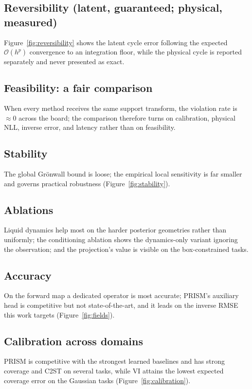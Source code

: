 \documentclass{article}
\begin{document}
\subsection{Reversibility (latent, guaranteed; physical, measured)}

Figure~\ref{fig:reversibility} shows the latent cycle error following the expected
$\mathcal{O}(h^{p})$ convergence to an integration floor, while the physical cycle
is reported separately and never presented as exact.

\subsection{Feasibility: a fair comparison}

When every method receives the same support transform, the violation rate is
$\approx 0$ across the board; the comparison therefore turns on calibration,
physical NLL, inverse error, and latency rather than on feasibility.

\subsection{Stability}

The global Gr\"onwall bound is loose; the empirical local sensitivity is far
smaller and governs practical robustness (Figure~\ref{fig:stability}).

\subsection{Ablations}



Liquid dynamics help most on the harder posterior geometries rather than
uniformly; the conditioning ablation shows the dynamics-only variant ignoring the
observation; and the projection's value is visible on the box-constrained tasks.

\subsection{Accuracy}

On the forward map a dedicated operator is most accurate; PRISM's auxiliary head is
competitive but not state-of-the-art, and it leads on the inverse RMSE this work
targets (Figure~\ref{fig:fields}).

\subsection{Calibration across domains}

PRISM is competitive with the strongest learned baselines and has strong coverage
and C2ST on several tasks, while VI attains the lowest expected coverage error on
the Gaussian tasks (Figure~\ref{fig:calibration}).
\end{document}
